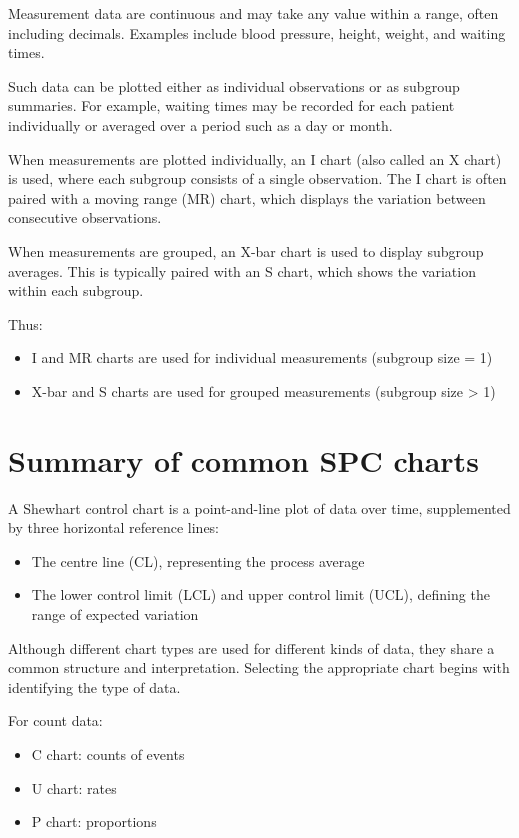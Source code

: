 \documentclass[
]{book}
\providecommand{\tightlist}{%
  \setlength{\itemsep}{0pt}\setlength{\parskip}{0pt}}
\begin{document}
Measurement data are continuous and may take any value within a range, often including decimals. Examples include blood pressure, height, weight, and waiting times.

Such data can be plotted either as individual observations or as subgroup summaries. For example, waiting times may be recorded for each patient individually or averaged over a period such as a day or month.

When measurements are plotted individually, an I chart (also called an X chart) is used, where each subgroup consists of a single observation. The I chart is often paired with a moving range (MR) chart, which displays the variation between consecutive observations.

When measurements are grouped, an X-bar chart is used to display subgroup averages. This is typically paired with an S chart, which shows the variation within each subgroup.

Thus:

\begin{itemize}
\tightlist
\item
  I and MR charts are used for individual measurements (subgroup size = 1)
\item
  X-bar and S charts are used for grouped measurements (subgroup size \textgreater{} 1)
\end{itemize}

\section{Summary of common SPC charts}\label{summary-of-common-spc-charts}

A Shewhart control chart is a point-and-line plot of data over time, supplemented by three horizontal reference lines:

\begin{itemize}
\tightlist
\item
  The centre line (CL), representing the process average
\item
  The lower control limit (LCL) and upper control limit (UCL), defining the range of expected variation
\end{itemize}

Although different chart types are used for different kinds of data, they share a common structure and interpretation. Selecting the appropriate chart begins with identifying the type of data.

For count data:

\begin{itemize}
\tightlist
\item
  C chart: counts of events
\item
  U chart: rates
\item
  P chart: proportions
\end{itemize}
\end{document}
